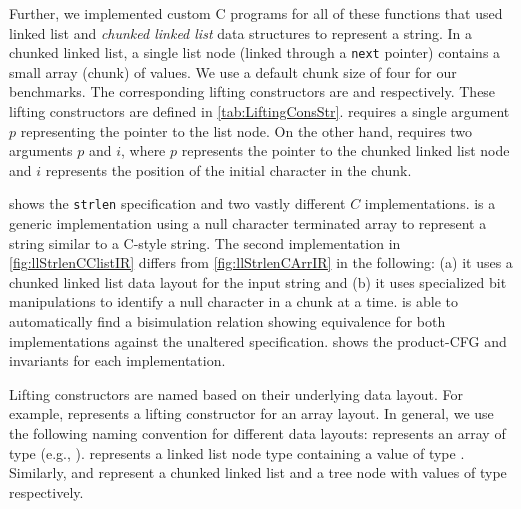 Further, we implemented
custom C programs for all of these functions that used
linked list
and {\em chunked linked list} data structures
to represent a string.
In a chunked linked list, a single list node (linked
through a {\tt next} pointer)
contains a small array (chunk) of values.
We use a default chunk size of four for our
benchmarks.
The corresponding lifting constructors are 
and  respectively.
These lifting constructors are defined in \cref{tab:LiftingConsStr}.
 requires a single
argument $p$ representing the pointer to the list node.
On the other hand,  requires two arguments $p$
and $i$, where $p$ represents the pointer to the chunked linked list node
and $i$ represents the position of the initial character in the chunk.

 shows the {\tt strlen} specification and two vastly
different $C$ implementations.  is a generic implementation
using a null character terminated array to represent a string similar to a C-style string.
The second implementation in \cref{fig:llStrlenCClistIR} differs from \cref{fig:llStrlenCArrIR}
in the following: (a) it uses a chunked linked list data layout for the input string
and (b) it uses specialized bit manipulations to identify a null character in a chunk at a time.
\toolName{} is able to automatically find a bisimulation relation showing equivalence
for both implementations against the unaltered specification.
 shows the product-CFG and invariants for each implementation.



Lifting constructors are named based on their underlying data layout.
For example,  represents a  lifting constructor
for an array layout.
In general, we use the following naming convention for different data layouts:
 represents an array of type  (e.g., ).
 represents a linked list node type containing a value of type .
Similarly,  and  represent a chunked linked list and a tree node
with values of type  respectively.


\vspace{-15px}
